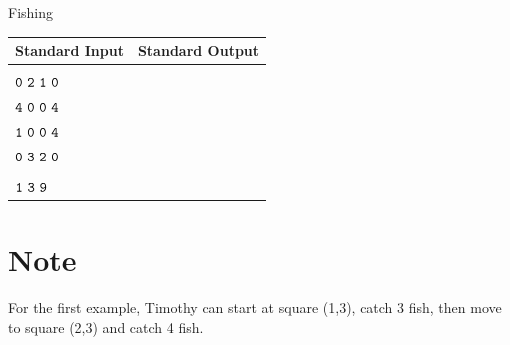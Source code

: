 \documentclass{xcpc}
\begin{document}
\begin{problem}{Fishing}
	\begin{table}[h]
		\begin{tabular}{|l|l|}
			\hline
			\textbf{Standard Input} & \textbf{Standard Output} \\ \hline
			\makecell[l]{$\tt{4\ 4}$\\$\tt{0\ 2\ 1\ 0}$\\$\tt{4\ 0\ 0\ 4}$\\$\tt{1\ 0\ 0\ 4}$\\$\tt{0\ 3\ 2\ 0}$} & \makecell[l]{$\tt{7}$} \\ \hline
			\makecell[l]{$\tt{1 3}$\\$\tt{1\ 3\ 9}$} & \makecell[l]{$\tt{13}$} \\ \hline
		\end{tabular}
	\end{table}
	
	\section*{Note}
	
	For the first example, Timothy can start at square (1,3), catch 3 fish, then move to square (2,3) and catch 4 fish.
	\end{problem}
\end{document}
